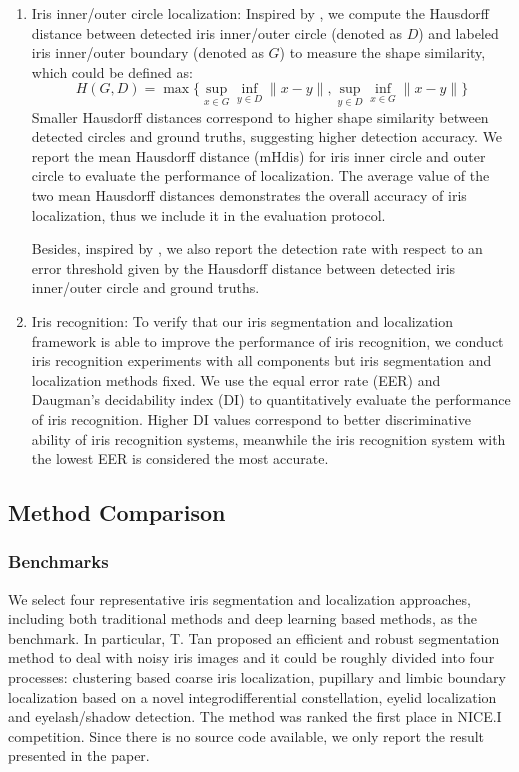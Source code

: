 \documentclass[journal]{IEEEtran}
\begin{document}
\begin{enumerate}
  \item Iris inner/outer circle localization: Inspired by \cite{sirinukunwattana2017gland}, we compute the Hausdorff distance between detected iris inner/outer circle (denoted as $D$) and labeled iris inner/outer boundary (denoted as $G$) to measure the shape similarity, which could be defined as:
      \begin{equation}\label{eq:localization}
        H(G,D)=\max\{\sup_{x\in G}\inf_{y\in D}\parallel x-y \parallel, \sup_{y\in D}\inf_{x\in G} \parallel x-y\parallel\}
      \end{equation}
      \quad Smaller Hausdorff distances correspond to higher shape similarity between detected circles and ground truths, suggesting higher detection accuracy.  We report the mean Hausdorff distance (mHdis) for iris inner circle and outer circle to evaluate the performance of localization.
      The average value of the two mean Hausdorff distances demonstrates the overall accuracy of iris localization, thus we include it in the evaluation protocol.

      \quad Besides, inspired by \cite{fuhl2016evaluation}, we also report the detection rate with respect to an error threshold given by the Hausdorff distance between detected iris inner/outer circle and ground truths.
  \item Iris recognition: To verify that our iris segmentation and localization framework is able to improve the performance of iris recognition, we conduct iris recognition experiments with all components but iris segmentation and localization methods fixed. We use the equal error rate (EER) and Daugman's decidability index (DI)\cite{Daugman_id} to quantitatively evaluate the performance of iris recognition. Higher DI values correspond to better discriminative ability of iris recognition systems, meanwhile the iris recognition system with the lowest EER is considered the most accurate.
\end{enumerate}

\subsection{Method Comparison}
\subsubsection{Benchmarks}
We select four representative iris segmentation and localization approaches, including both traditional methods and deep learning based methods, as the benchmark.
In particular, T. Tan \etal\cite{tan2010efficient} proposed an efficient and robust segmentation method to deal with noisy iris images and it could be roughly divided into four processes: clustering based coarse iris localization, pupillary and limbic boundary localization based on a novel integrodifferential
constellation, eyelid localization and eyelash/shadow detection.
The method was ranked the first place in NICE.I competition\cite{nice1}. Since there is no source code available, we only report the result presented in the paper.
\end{document}
